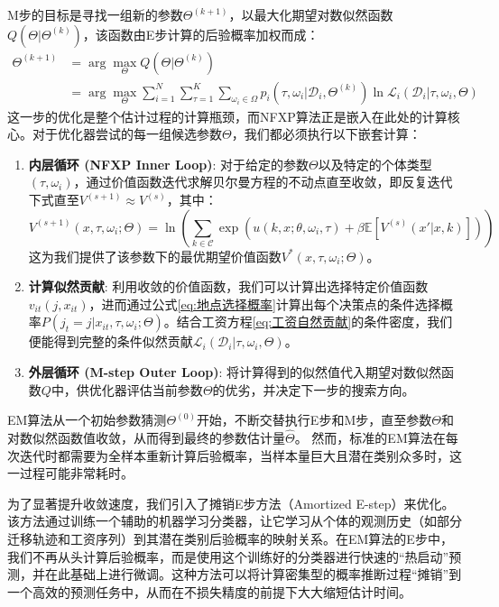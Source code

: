 \documentclass[
  a4paper,
  zihao=-4,
  fontset=mac,
  AutoFakeBold,
  AutoFakeSlant,
  oneside]{ctexbook}
\begin{document}
M步的目标是寻找一组新的参数$\Theta^{(k+1)}$，以最大化期望对数似然函数$Q(\Theta | \Theta^{(k)})$，该函数由E步计算的后验概率加权而成：
\begin{equation}
\begin{split}
    \Theta^{(k+1)} & = \arg\max_{\Theta} Q(\Theta | \Theta^{(k)}) 
    \\ & = \arg\max_{\Theta} \sum_{i=1}^{N} \sum_{\tau=1}^K \sum_{\omega_i \in \Omega} p_{i}(\tau, \omega_i | \mathcal{D}_i, \Theta^{(k)}) \ln \mathcal{L}_i(\mathcal{D}_i | \tau, \omega_i, \Theta)
\end{split}
\end{equation}
这一步的优化是整个估计过程的计算瓶颈，而NFXP算法正是嵌入在此处的计算核心。对于优化器尝试的每一组候选参数$\Theta$，我们都必须执行以下嵌套计算：
\begin{enumerate}
    \item \textbf{内层循环 (NFXP Inner Loop)}: 对于给定的参数$\Theta$以及特定的个体类型$(\tau, \omega_i)$，通过价值函数迭代求解贝尔曼方程的不动点直至收敛，即反复迭代下式直至$V^{(s+1)} \approx V^{(s)}$，其中：
    \begin{equation}
        V^{(s+1)}(x, \tau, \omega_i; \Theta) = \ln \left( \sum_{k \in \mathcal{C}} \exp \left( u(k, x; \theta, \omega_i, \tau) + \beta \mathbb{E}[V^{(s)}(x'|x,k)] \right) \right)
    \end{equation}
    这为我们提供了该参数下的最优期望价值函数$V^*(x, \tau, \omega_i; \Theta)$。

    \item \textbf{计算似然贡献}: 利用收敛的价值函数，我们可以计算出选择特定价值函数$v_{it}(j, x_{it})$，进而通过公式\eqref{eq:地点选择概率}计算出每个决策点的条件选择概率$P(j_t=j | x_{it}, \tau, \omega_i; \Theta)$。结合工资方程\eqref{eq:工资自然贡献}的条件密度，我们便能得到完整的条件似然贡献$\mathcal{L}_i(\mathcal{D}_i | \tau, \omega_i, \Theta)$。

    \item \textbf{外层循环 (M-step Outer Loop)}: 将计算得到的似然值代入期望对数似然函数$Q$中，供优化器评估当前参数$\Theta$的优劣，并决定下一步的搜索方向。
\end{enumerate}

EM算法从一个初始参数猜测$\Theta^{(0)}$开始，不断交替执行E步和M步，直至参数$\Theta$和对数似然函数值收敛，从而得到最终的参数估计量$\hat{\Theta}$。
然而，标准的EM算法在每次迭代时都需要为全样本重新计算后验概率，当样本量巨大且潜在类别众多时，这一过程可能非常耗时。

为了显著提升收敛速度，我们引入了摊销E步方法（Amortized E-step）来优化。该方法通过训练一个辅助的机器学习分类器，让它学习从个体的观测历史（如部分迁移轨迹和工资序列）到其潜在类别后验概率的映射关系。在EM算法的E步中，我们不再从头计算后验概率，而是使用这个训练好的分类器进行快速的“热启动”预测，并在此基础上进行微调。这种方法可以将计算密集型的概率推断过程“摊销”到一个高效的预测任务中，从而在不损失精度的前提下大大缩短估计时间。
\end{document}
